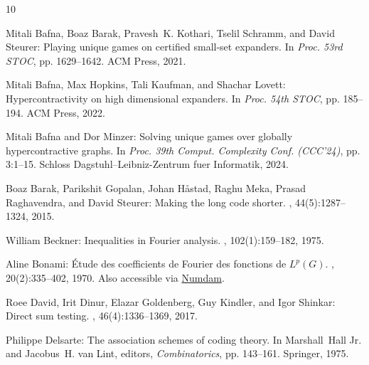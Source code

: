\documentclass[11pt]{article}
\begin{document}
\tocrefpdfbookmark
\begin{thebibliography}{10}

{\sc Mitali Bafna, Boaz Barak, Pravesh~K. Kothari, Tselil Schramm, and David
  Steurer}: Playing unique games on certified small-set expanders.
\newblock In {\em Proc. 53rd STOC}, pp. 1629--1642. ACM Press, 2021.
\newblock [\epfmtdoi{10.1145/3406325.3451099}]

{\sc Mitali Bafna, Max Hopkins, Tali Kaufman, and Shachar Lovett}:
  Hypercontractivity on high dimensional expanders.
\newblock In {\em Proc. 54th STOC}, pp. 185--194. ACM Press, 2022.
\newblock [\epfmtdoi{10.1145/3519935.3520040}]

{\sc Mitali Bafna and Dor Minzer}: Solving unique games over globally
  hypercontractive graphs.
\newblock In {\em Proc. 39th Comput. Complexity Conf. (CCC'24)}, pp. 3:1--15.
  Schloss Dagstuhl--Leibniz-Zentrum fuer Informatik, 2024.

{\sc Boaz Barak, Parikshit Gopalan, Johan H{\aa}stad, Raghu Meka, Prasad
  Raghavendra, and David Steurer}: Making the long code shorter.
, 44(5):1287--1324, 2015.
\newblock [\epfmtdoi{10.1137/130929394}]

{\sc William Beckner}: Inequalities in {F}ourier analysis.
, 102(1):159--182, 1975.
\newblock [\epfmtdoi{10.2307/1970980}]

{\sc Aline Bonami}: \'{E}tude des coefficients de {F}ourier des fonctions de
  {$L^p(G)$}.
, 20(2):335--402, 1970.
\newblock Also accessible via
  \href{http://www.numdam.org/item/AIF\_1970\_\_20\_2\_335\_0}{Numdam}.

{\sc Roee David, Irit Dinur, Elazar Goldenberg, Guy Kindler, and Igor Shinkar}:
  Direct sum testing.
, 46(4):1336--1369, 2017.
\newblock [\epfmtdoi{10.1137/16M1061655}]

{\sc Philippe Delsarte}: The association schemes of coding theory.
\newblock In {\sc Marshall~Hall Jr. and Jacobus~H. van Lint}, editors, {\em
  Combinatorics}, pp. 143--161. Springer, 1975.
\newblock [\epfmtdoi{10.1007/978-94-010-1826-5\_7}]


\end{thebibliography}
\end{document}
